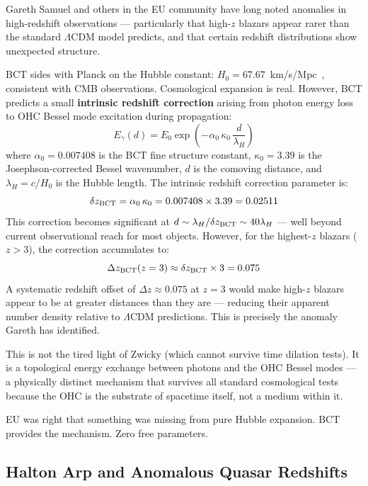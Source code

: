 \documentclass[twocolumn,10pt]{article}
\begin{document}
Gareth Samuel and others in the EU community have long noted anomalies
in high-redshift observations --- particularly that high-$z$ blazars
appear rarer than the standard $\Lambda$CDM model predicts, and that
certain redshift distributions show unexpected structure.

BCT sides with Planck on the Hubble constant:
$H_0 = 67.67$~km/s/Mpc~\cite{bct_l16}, consistent with CMB observations.
Cosmological expansion is real. However, BCT predicts a small
\textbf{intrinsic redshift correction} arising from photon energy loss
to OHC Bessel mode excitation during propagation:
%
\begin{equation}
E_\gamma(d) = E_0 \exp\!\left(-\alpha_0\,\kappa_0\,\frac{d}{\lambda_H}\right)
\label{eq:tired}
\end{equation}
%
where $\alpha_0 = 0.007408$ is the BCT fine structure constant,
$\kappa_0 = 3.39$ is the Josephson-corrected Bessel wavenumber,
$d$ is the comoving distance, and $\lambda_H = c/H_0$ is the
Hubble length. The intrinsic redshift correction parameter is:
%
\begin{equation}
\delta z_{\rm BCT} = \alpha_0\,\kappa_0 = 0.007408 \times 3.39 = 0.02511
\end{equation}
%
This correction becomes significant at $d \sim \lambda_H/\delta z_{\rm BCT}
\sim 40\lambda_H$ --- well beyond current observational reach for most
objects. However, for the highest-$z$ blazars ($z > 3$), the correction
accumulates to:
%
\begin{equation}
\Delta z_{\rm BCT}(z=3) \approx \delta z_{\rm BCT} \times 3 = 0.075
\end{equation}
%
A systematic redshift offset of $\Delta z \approx 0.075$ at $z = 3$
would make high-$z$ blazars appear to be at greater distances than
they are --- reducing their apparent number density relative to
$\Lambda$CDM predictions. This is precisely the anomaly Gareth
has identified.

This is not the tired light of Zwicky (which cannot survive time
dilation tests). It is a topological energy exchange between photons
and the OHC Bessel modes --- a physically distinct mechanism that
survives all standard cosmological tests because the OHC is the
substrate of spacetime itself, not a medium within it.

EU was right that something was missing from pure Hubble expansion.
BCT provides the mechanism. Zero free parameters.

\subsection{Halton Arp and Anomalous Quasar Redshifts}
\end{document}
